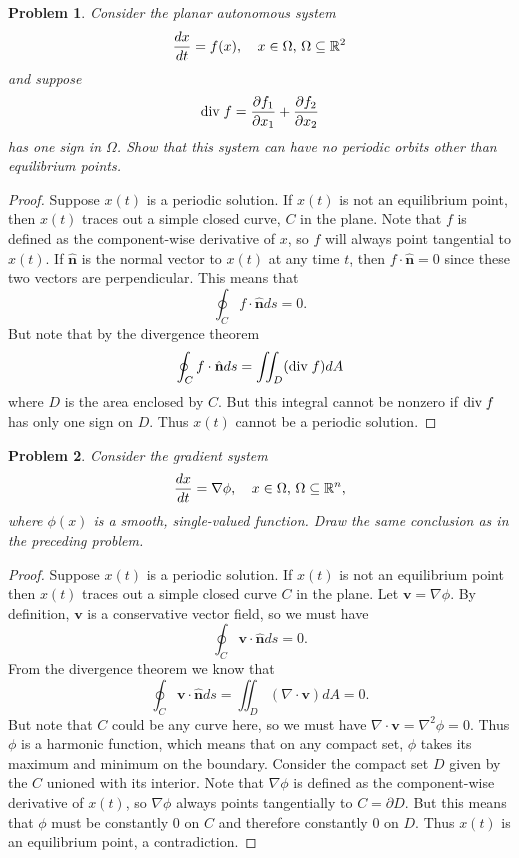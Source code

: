 \documentclass{article}
\newcommand{\Div}{\textup{div}\;}
\newtheorem{problem}{Problem}
\begin{document}
\begin{problem}
Consider the planar autonomous system
\[
\begin{tabular}{cc}
$\displaystyle{\frac{dx}{dt} = f(x)}$, & $\displaystyle{x \in \Omega}$, $\displaystyle{\Omega \subseteq \mathbb{R}^2}$
\end{tabular}
\]
and suppose
\[
\Div f = \frac{\partial f_1}{\partial x_1} + \frac{\partial f_2}{\partial x_2}
\]
has one sign in $\Omega$. Show that this system can have no periodic orbits other than equilibrium points.
\end{problem}
\begin{proof}
Suppose $x(t)$ is a periodic solution. If $x(t)$ is not an equilibrium point, then $x(t)$ traces out a simple closed curve, $C$ in the plane. Note that $f$ is defined as the component-wise derivative of $x$, so $f$ will always point tangential to $x(t)$. If $\hat{\mathbf{n}}$ is the normal vector to $x(t)$ at any time $t$, then $f \cdot \hat{\mathbf{n}} = 0$ since these two vectors are perpendicular. This means that
\[
\oint_C f \cdot \hat{\mathbf{n}} ds = 0.
\]
But note that by the divergence theorem
\[
\oint_C f \cdot \hat{\mathbf{n}} ds = \iint_D (\Div f) dA
\]
where $D$ is the area enclosed by $C$. But this integral cannot be nonzero if $\Div f$ has only one sign on $D$. Thus $x(t)$ cannot be a periodic solution.
\end{proof}

\begin{problem}
Consider the gradient system
\[
\begin{tabular}{cc}
$\displaystyle{\frac{dx}{dt} = \nabla \phi}$, & $\displaystyle{x \in \Omega}$, $\displaystyle{\Omega \subseteq \mathbb{R}^n}$,
\end{tabular}
\]
where $\phi(x)$ is a smooth, single-valued function. Draw the same conclusion as in the preceding problem.
\end{problem}
\begin{proof}
Suppose $x(t)$ is a periodic solution. If $x(t)$ is not an equilibrium point then $x(t)$ traces out a simple closed curve $C$ in the plane. Let $\mathbf{v} = \nabla \phi$. By definition, $\mathbf{v}$ is a conservative vector field, so we must have
\[
\oint_C \mathbf{v} \cdot \hat{\mathbf{n}} ds = 0.
\]
From the divergence theorem we know that
\[
\oint_C \mathbf{v} \cdot \hat{\mathbf{n}} ds = \iint_D (\nabla \cdot \mathbf{v}) dA = 0.
\]
But note that $C$ could be any curve here, so we must have $\nabla \cdot \mathbf{v} = \nabla^2 \phi = 0$. Thus $\phi$ is a harmonic function, which means that on any compact set, $\phi$ takes its maximum and minimum on the boundary. Consider the compact set $D$ given by the $C$ unioned with its interior. Note that $\nabla \phi$ is defined as the component-wise derivative of $x(t)$, so $\nabla \phi$ always points tangentially to $C = \partial D$. But this means that $\phi$ must be constantly $0$ on $C$ and therefore constantly $0$ on $D$. Thus $x(t)$ is an equilibrium point, a contradiction.
\end{proof}
\end{document}
